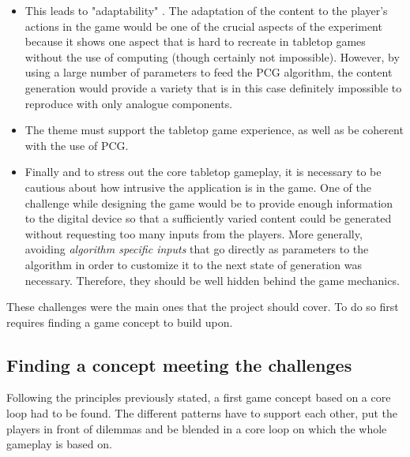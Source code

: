 \begin{itemize}
\item This leads to "adaptability" \cite{pdf:pcgbased}. The adaptation of the content to the player's actions in the game would be one of the crucial aspects of the experiment because it shows one aspect that is hard to recreate in tabletop games without the use of computing (though certainly not impossible). However, by using a large number of parameters to feed the PCG algorithm, the content generation would provide a variety that is in this case definitely impossible to reproduce with only analogue components.
\item The theme must support the tabletop game experience, as well as be coherent with the use of PCG.
\item Finally and to stress out the core tabletop gameplay, it is necessary to be cautious about how intrusive the application is in the game. One of the challenge while designing the game would be to provide enough information to the digital device so that a sufficiently varied content could be generated without requesting too many inputs from the players. More generally, avoiding \textit{algorithm specific inputs} that go directly as parameters to the algorithm in order to customize it to the next state of generation was necessary. Therefore, they should be well hidden  behind the game mechanics.
\end{itemize}
These challenges were the main ones that the project should cover. To do so first requires finding a game concept to build upon.
\subsection{Finding a concept meeting the challenges}
Following the principles previously stated, a first game concept based on a core loop had to be found. The different patterns have to support each other, put the players in front of dilemmas and be blended in a core loop on which the whole gameplay is based on.
